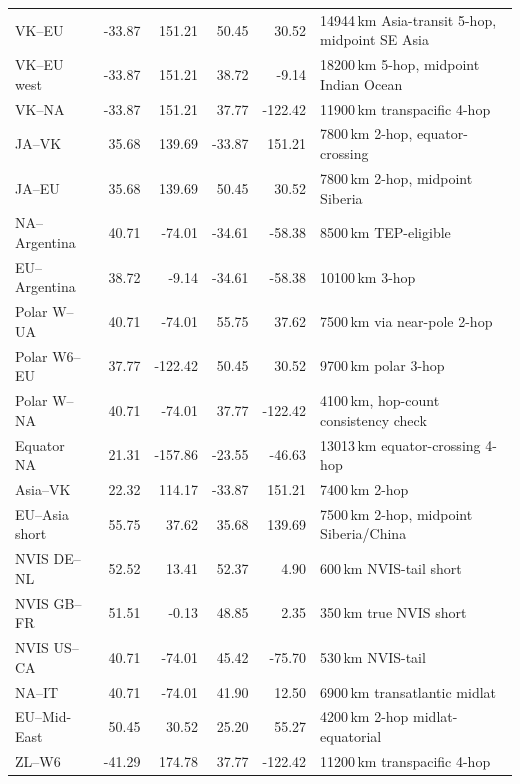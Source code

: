 \documentclass[11pt,a4paper]{article}
\begin{document}
\begin{table}[H]
\begin{tabular}{@{}lrrrrl@{}}
VK--EU            & -33.87 &  151.21 &  50.45 &   30.52 & 14944\,km Asia-transit 5-hop, midpoint SE Asia \\
VK--EU west       & -33.87 &  151.21 &  38.72 &   -9.14 & 18200\,km 5-hop, midpoint Indian Ocean \\
VK--NA            & -33.87 &  151.21 &  37.77 & -122.42 & 11900\,km transpacific 4-hop \\
JA--VK            &  35.68 &  139.69 & -33.87 &  151.21 & 7800\,km 2-hop, equator-crossing \\
JA--EU            &  35.68 &  139.69 &  50.45 &   30.52 & 7800\,km 2-hop, midpoint Siberia \\
NA--Argentina     &  40.71 &  -74.01 & -34.61 &  -58.38 & 8500\,km TEP-eligible \\
EU--Argentina     &  38.72 &   -9.14 & -34.61 &  -58.38 & 10100\,km 3-hop \\
Polar W--UA       &  40.71 &  -74.01 &  55.75 &   37.62 & 7500\,km via near-pole 2-hop \\
Polar W6--EU      &  37.77 & -122.42 &  50.45 &   30.52 & 9700\,km polar 3-hop \\
Polar W--NA       &  40.71 &  -74.01 &  37.77 & -122.42 & 4100\,km, hop-count consistency check \\
Equator NA        &  21.31 & -157.86 & -23.55 &  -46.63 & 13013\,km equator-crossing 4-hop \\
Asia--VK          &  22.32 &  114.17 & -33.87 &  151.21 & 7400\,km 2-hop \\
EU--Asia short    &  55.75 &   37.62 &  35.68 &  139.69 & 7500\,km 2-hop, midpoint Siberia/China \\
NVIS DE--NL       &  52.52 &   13.41 &  52.37 &    4.90 & 600\,km NVIS-tail short \\
NVIS GB--FR       &  51.51 &   -0.13 &  48.85 &    2.35 & 350\,km true NVIS short \\
NVIS US--CA       &  40.71 &  -74.01 &  45.42 &  -75.70 & 530\,km NVIS-tail \\
NA--IT            &  40.71 &  -74.01 &  41.90 &   12.50 & 6900\,km transatlantic midlat \\
EU--Mid-East      &  50.45 &   30.52 &  25.20 &   55.27 & 4200\,km 2-hop midlat-equatorial \\
ZL--W6            & -41.29 &  174.78 &  37.77 & -122.42 & 11200\,km transpacific 4-hop \\
\bottomrule
\end{tabular}
\end{table}
\end{document}
